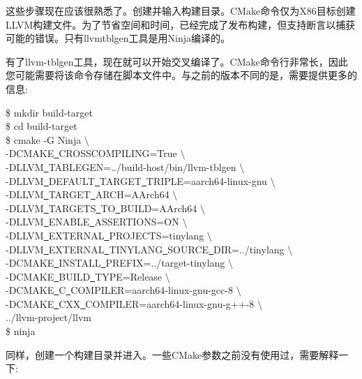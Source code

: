 这些步骤现在应该很熟悉了。创建并输入构建目录。CMake命令仅为X86目标创建LLVM构建文件。为了节省空间和时间，已经完成了发布构建，但支持断言以捕获可能的错误。只有llvmtblgen工具是用Ninja编译的。\par

有了llvm-tblgen工具，现在就可以开始交叉编译了。CMake命令行非常长，因此您可能需要将该命令存储在脚本文件中。与之前的版本不同的是，需要提供更多的信息:\par

\begin{tcolorbox}[colback=white,colframe=black]
	\$ mkdir build-target \\
	\$ cd build-target \\
	\$ cmake -G Ninja $\setminus$ \\
	-DCMAKE\underline{~}CROSSCOMPILING=True $\setminus$ \\
	-DLLVM\underline{~}TABLEGEN=../build-host/bin/llvm-tblgen $\setminus$ \\
	-DLLVM\underline{~}DEFAULT\underline{~}TARGET\underline{~}TRIPLE=aarch64-linux-gnu $\setminus$ \\
	-DLLVM\underline{~}TARGET\underline{~}ARCH=AArch64 $\setminus$ \\
	-DLLVM\underline{~}TARGETS\underline{~}TO\underline{~}BUILD=AArch64 $\setminus$ \\
	-DLLVM\underline{~}ENABLE\underline{~}ASSERTIONS=ON $\setminus$ \\
	-DLLVM\underline{~}EXTERNAL\underline{~}PROJECTS=tinylang $\setminus$ \\
	-DLLVM\underline{~}EXTERNAL\underline{~}TINYLANG\underline{~}SOURCE\underline{~}DIR=../tinylang $\setminus$ \\
	-DCMAKE\underline{~}INSTALL\underline{~}PREFIX=../target-tinylang $\setminus$ \\	-DCMAKE\underline{~}BUILD\underline{~}TYPE=Release $\setminus$ \\
	-DCMAKE\underline{~}C\underline{~}COMPILER=aarch64-linux-gnu-gcc-8 $\setminus$ \\
	-DCMAKE\underline{~}CXX\underline{~}COMPILER=aarch64-linux-gnu-g++-8 $\setminus$ \\
	../llvm-project/llvm \\
	\$ ninja
\end{tcolorbox}

同样，创建一个构建目录并进入。一些CMake参数之前没有使用过，需要解释一下:\par

